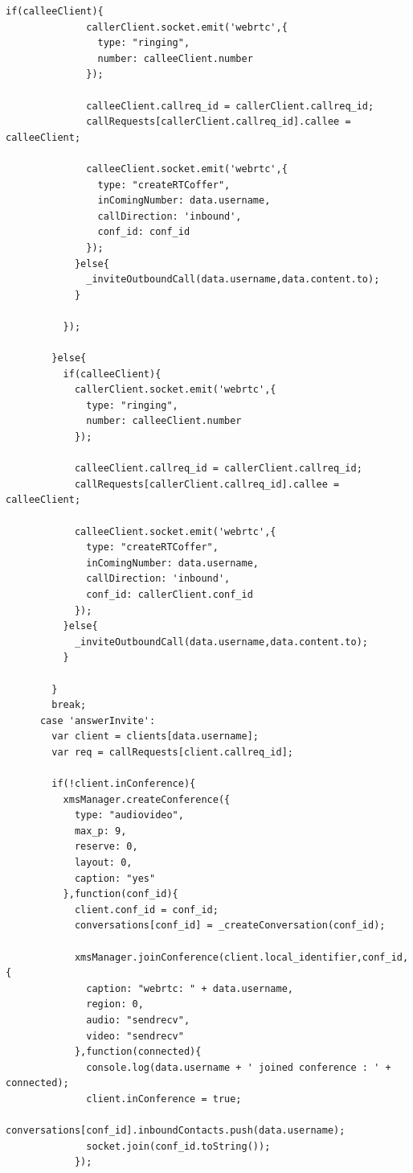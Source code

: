 \begin{appendices}
\begin{lstlisting}[caption={socket.js on Application Server},label={code:server_socket}]
            if(calleeClient){
              callerClient.socket.emit('webrtc',{
                type: "ringing",
                number: calleeClient.number
              });

              calleeClient.callreq_id = callerClient.callreq_id;
              callRequests[callerClient.callreq_id].callee = calleeClient;

              calleeClient.socket.emit('webrtc',{
                type: "createRTCoffer",
                inComingNumber: data.username,
                callDirection: 'inbound',
                conf_id: conf_id
              });
            }else{
              _inviteOutboundCall(data.username,data.content.to);
            }   
            
          });

        }else{
          if(calleeClient){
            callerClient.socket.emit('webrtc',{
              type: "ringing",
              number: calleeClient.number
            });

            calleeClient.callreq_id = callerClient.callreq_id;
            callRequests[callerClient.callreq_id].callee = calleeClient;

            calleeClient.socket.emit('webrtc',{
              type: "createRTCoffer",
              inComingNumber: data.username,
              callDirection: 'inbound',
              conf_id: callerClient.conf_id
            });
          }else{
            _inviteOutboundCall(data.username,data.content.to);
          }
          
        }
        break;
      case 'answerInvite':
        var client = clients[data.username];
        var req = callRequests[client.callreq_id];

        if(!client.inConference){
          xmsManager.createConference({
            type: "audiovideo",
            max_p: 9,
            reserve: 0,
            layout: 0,
            caption: "yes"
          },function(conf_id){
            client.conf_id = conf_id;
            conversations[conf_id] = _createConversation(conf_id);

            xmsManager.joinConference(client.local_identifier,conf_id,{
              caption: "webrtc: " + data.username,
              region: 0,
              audio: "sendrecv",
              video: "sendrecv"
            },function(connected){
              console.log(data.username + ' joined conference : ' + connected);
              client.inConference = true;
              conversations[conf_id].inboundContacts.push(data.username);
              socket.join(conf_id.toString());
            });
            

\end{lstlisting}
\end{appendices}

